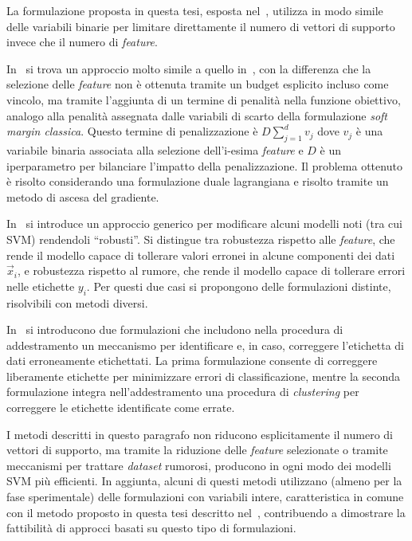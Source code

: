 La formulazione proposta in questa tesi, esposta nel~, utilizza in modo simile delle variabili binarie per limitare direttamente il numero di vettori di supporto invece che il numero di \emph{feature}.

In~\cite{2017_lagrangian_feature_selection} si trova un approccio molto simile a quello in~\cite{2014_MIP_feature_selection}, con la differenza che la selezione delle \emph{feature} non è ottenuta tramite un budget esplicito incluso come vincolo, ma tramite l'aggiunta di un termine di penalità nella funzione obiettivo, analogo alla penalità assegnata dalle variabili di scarto della formulazione \emph{soft margin classica}.
Questo termine di penalizzazione è $ D\sum_{j=1}^{d}v_j$ dove $v_j$ è una variabile binaria associata alla selezione dell'i-esima \emph{feature} e $D$ è un iperparametro per bilanciare l'impatto della penalizzazione. 
Il problema ottenuto è risolto considerando una formulazione duale lagrangiana e risolto tramite un metodo di ascesa del gradiente. 

In~\cite{2019_robust_classification} si introduce un approccio generico per modificare alcuni modelli noti (tra cui SVM) rendendoli ``robusti''.
Si distingue tra robustezza rispetto alle \emph{feature}, che rende il modello capace di tollerare valori erronei in alcune componenti dei dati $\Vec{x}_i$, e robustezza rispetto al rumore, che rende il modello capace di tollerare errori nelle etichette $y_i$.
Per questi due casi si propongono delle formulazioni distinte, risolvibili con metodi diversi.

In~\cite{2022_MILP_noise_relabeling} si introducono due formulazioni che includono nella procedura di addestramento un meccanismo per identificare e, in caso, correggere l'etichetta di dati erroneamente etichettati.
La prima formulazione consente di correggere liberamente etichette per minimizzare errori di classificazione, mentre la seconda formulazione integra nell'addestramento una procedura di \emph{clustering} per correggere le etichette identificate come errate.

I metodi descritti in questo paragrafo non riducono esplicitamente il numero di vettori di supporto, ma tramite la riduzione delle \emph{feature} selezionate o tramite meccanismi per trattare \emph{dataset} rumorosi, producono in ogni modo dei modelli SVM più efficienti.
In aggiunta, alcuni di questi metodi utilizzano (almeno per la fase sperimentale) delle formulazioni con variabili intere, caratteristica in comune con il metodo proposto in questa tesi descritto nel~, contribuendo a dimostrare la fattibilità di approcci basati su questo tipo di formulazioni.

